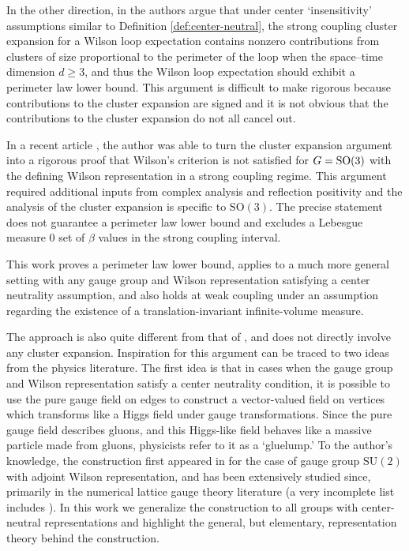 \documentclass[reqno]{amsart}
\begin{document}
In the other direction, in \cite{GlimmJaffeNonConfinement,seiler1982gauge} the authors argue that under center `insensitivity' assumptions similar to Definition \ref{def:center-neutral}, the strong coupling cluster expansion for a Wilson loop expectation contains nonzero contributions from clusters of size proportional to the perimeter of the loop when the space--time dimension $d \geq 3$, and thus the Wilson loop expectation should exhibit a perimeter law lower bound. This argument is difficult to make rigorous because contributions to the cluster expansion are signed and it is not obvious that the contributions to the cluster expansion do not all cancel out.

In a recent article \cite{nissim2026deconfinementmathrmso3latticeyangmills}, the author was able to turn the cluster expansion argument into a rigorous proof that Wilson's criterion is not satisfied for $G =\mathrm{SO}(3)$ with the defining Wilson representation in a strong coupling regime. This argument required additional inputs from complex analysis and reflection positivity and the analysis of the cluster expansion is specific to $\mathrm{SO}(3)$. The precise statement does not guarantee a perimeter law lower bound and excludes a Lebesgue measure $0$ set of $\beta$ values in the strong coupling interval. 

This work proves a perimeter law lower bound, applies to a much more general setting with any gauge group and Wilson representation satisfying a center neutrality assumption, and also holds at weak coupling under an assumption regarding the existence of a translation-invariant infinite-volume measure.

The approach is also quite different from that of \cite{nissim2026deconfinementmathrmso3latticeyangmills}, and does not directly involve any cluster expansion. Inspiration for this argument can be traced to two ideas from the physics literature. The first idea is that in cases when the gauge group and Wilson representation satisfy a center neutrality condition, it is possible to use the pure gauge field on edges to construct a vector-valued field on vertices which transforms like a Higgs field under gauge transformations. Since the pure gauge field describes gluons, and this Higgs-like field behaves like a massive particle made from gluons, physicists refer to it as a `gluelump.' To the author's knowledge, the construction first appeared in \cite{Michael1985AdjointSources} for the case of gauge group $\mathrm{SU}(2)$ with adjoint Wilson representation, and has been extensively studied since, primarily in the numerical lattice gauge theory literature (a very incomplete list includes \cite{JoryszMichael1988FieldConfigurations,PhilipsenWittig1999AdjointStringBreaking,PepeWiese2009StringDecay}). In this work we generalize the construction to all groups with center-neutral representations and highlight the general, but elementary, representation theory behind the construction.
\end{document}
